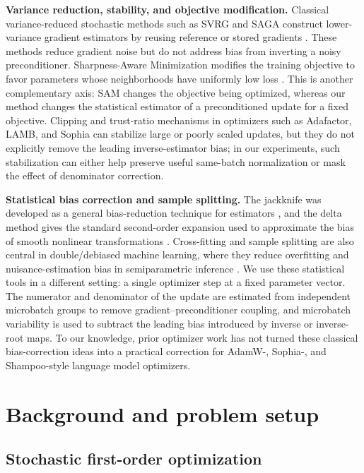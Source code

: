 \documentclass{article}
\begin{document}
\textbf{Variance reduction, stability, and objective modification.}
Classical variance-reduced stochastic methods such as SVRG and SAGA construct lower-variance gradient estimators by reusing reference or stored gradients \citep{johnson2013accelerating,defazio2014saga}. These methods reduce gradient noise but do not address bias from inverting a noisy preconditioner. Sharpness-Aware Minimization modifies the training objective to favor parameters whose neighborhoods have uniformly low loss \citep{foret2021sharpness}. This is another complementary axis: SAM changes the objective being optimized, whereas our method changes the statistical estimator of a preconditioned update for a fixed objective. Clipping and trust-ratio mechanisms in optimizers such as Adafactor, LAMB, and Sophia can stabilize large or poorly scaled updates, but they do not explicitly remove the leading inverse-estimator bias; in our experiments, such stabilization can either help preserve useful same-batch normalization or mask the effect of denominator correction.

\textbf{Statistical bias correction and sample splitting.}
The jackknife was developed as a general bias-reduction technique for estimators \citep{quenouille1956bias,efron1982jackknife}, and the delta method gives the standard second-order expansion used to approximate the bias of smooth nonlinear transformations \citep{vandervaart1998asymptotic}. Cross-fitting and sample splitting are also central in double/debiased machine learning, where they reduce overfitting and nuisance-estimation bias in semiparametric inference \citep{chernozhukov2018double}. We use these statistical tools in a different setting: a single optimizer step at a fixed parameter vector. The numerator and denominator of the update are estimated from independent microbatch groups to remove gradient--preconditioner coupling, and microbatch variability is used to subtract the leading bias introduced by inverse or inverse-root maps. To our knowledge, prior optimizer work has not turned these classical bias-correction ideas into a practical correction for AdamW-, Sophia-, and Shampoo-style language model optimizers.


\section{Background and problem setup}
\label{sec:background}

\subsection{Stochastic first-order optimization}
\end{document}
